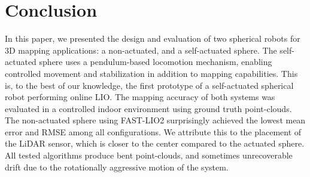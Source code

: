 \documentclass[english, bachelor, utf8]{base/thesis_telematics}
\begin{document}

\chapter{Conclusion}
In this paper, we presented the design and evaluation of two spherical robots for 3D mapping applications: a non-actuated, and a self-actuated sphere. 
The self-actuated sphere uses a pendulum-based locomotion mechanism, enabling controlled movement and stabilization in addition to mapping capabilities.
This is, to the best of our knowledge, the first prototype of a self-actuated spherical robot performing online LIO.   
The mapping accuracy of both systems was evaluated in a controlled indoor environment using ground truth point-clouds. 
The non-actuated sphere using FAST-LIO2 surprisingly achieved the lowest mean error and RMSE among all configurations.
We attribute this to the placement of the LiDAR sensor, which is closer to the center compared to the actuated sphere.
All tested algorithms produce bent point-clouds, and sometimes unrecoverable drift due to the rotationally aggressive motion of the system.  
\end{document}
